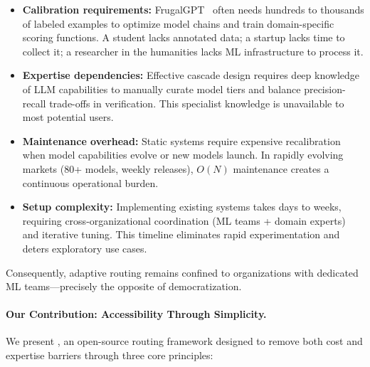 \begin{itemize}[leftmargin=*]
    \item \textbf{Calibration requirements:} FrugalGPT~\cite{chen2023frugalgpt} often needs hundreds to thousands of labeled examples to optimize model chains and train domain-specific scoring functions. A student lacks annotated data; a startup lacks time to collect it; a researcher in the humanities lacks ML infrastructure to process it.
    \item \textbf{Expertise dependencies:} Effective cascade design requires deep knowledge of LLM capabilities to manually curate model tiers and balance precision-recall trade-offs in verification. This specialist knowledge is unavailable to most potential users.
    \item \textbf{Maintenance overhead:} Static systems require expensive recalibration when model capabilities evolve or new models launch. In rapidly evolving markets (80+ models, weekly releases), $O(N)$ maintenance creates a continuous operational burden.
    \item \textbf{Setup complexity:} Implementing existing systems takes days to weeks, requiring cross-organizational coordination (ML teams + domain experts) and iterative tuning. This timeline eliminates rapid experimentation and deters exploratory use cases.
\end{itemize}

Consequently, adaptive routing remains confined to organizations with dedicated ML teams---precisely the opposite of democratization.

\paragraph{Our Contribution: Accessibility Through Simplicity.} We present \ours{}, an open-source routing framework designed to remove both cost and expertise barriers through three core principles:

